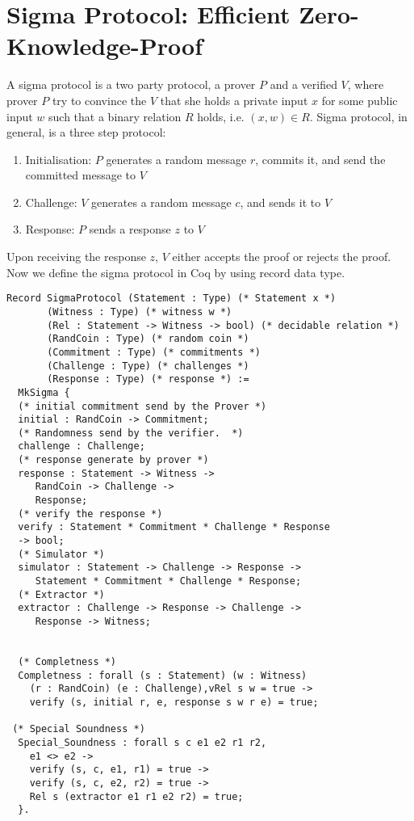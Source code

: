  



\section{Sigma Protocol: Efficient Zero-Knowledge-Proof}
\label{sec:sigma_coq}
A sigma protocol is a two party protocol, a prover $P$ and a verified $V$, where prover $P$ try to convince the $V$ that she 
holds a private input $x$ for some public input $w$ such that a binary relation $R$ holds, i.e. $(x, w) \in R$.  Sigma protocol, 
in general, is a three step protocol:
\begin{enumerate}
\item Initialisation: $P$ generates a random message $r$, commits it, and send the committed message to $V$
\item Challenge: $V$ generates a random message $c$, and sends it to $V$
\item Response: $P$ sends a response $z$ to $V$
\end{enumerate} 

\noindent
Upon receiving the response $z$, $V$ either accepts the proof or rejects the proof.  Now we define the sigma protocol in 
Coq by using record data type.

\begin{verbatim}
Record SigmaProtocol (Statement : Type) (* Statement x *)
       (Witness : Type) (* witness w *)
       (Rel : Statement -> Witness -> bool) (* decidable relation *)
       (RandCoin : Type) (* random coin *) 
       (Commitment : Type) (* commitments *)
       (Challenge : Type) (* challenges *) 
       (Response : Type) (* response *) :=
  MkSigma {
  (* initial commitment send by the Prover *)
  initial : RandCoin -> Commitment;
  (* Randomness send by the verifier.  *) 
  challenge : Challenge;
  (* response generate by prover *)
  response : Statement -> Witness ->
     RandCoin -> Challenge ->
     Response;
  (* verify the response *)
  verify : Statement * Commitment * Challenge * Response
  -> bool;
  (* Simulator *)
  simulator : Statement -> Challenge -> Response ->
     Statement * Commitment * Challenge * Response;
  (* Extractor *)
  extractor : Challenge -> Response -> Challenge -> 
     Response -> Witness;
  

  (* Completness *)
  Completness : forall (s : Statement) (w : Witness)
    (r : RandCoin) (e : Challenge),vRel s w = true -> 
    verify (s, initial r, e, response s w r e) = true;

 (* Special Soundness *)
  Special_Soundness : forall s c e1 e2 r1 r2,
    e1 <> e2 ->
    verify (s, c, e1, r1) = true ->
    verify (s, c, e2, r2) = true ->
    Rel s (extractor e1 r1 e2 r2) = true;
  }.
\end{verbatim}


